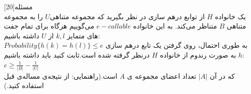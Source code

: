 ‌مسئله[20]
\\
یک خانواده $H$ از توابع درهم سازی در نظر بگیرید که مجموعه متناهی$U$  را به مجموعه متناهی $B$ متناظر می‌کند. به این خانواده $ e-callable$  می‌گوییم هرگاه برای تمام جفت های متمایز $k,l$ از $U$ داشته باشیم:  \\
$Probability\{h(k) = h(l)\} \le e$
به طوری احتمال، روی گرفتن یک تابع درهم سازی $h$  به صورت رندوم از خانواده $H$ درنظر گرفته شده است.ثابت کنید باید داشته باشیم:\\
$e \ge  \frac{1}{|B|} - \frac{1}{|U|}$\\
که در آن $|A|$ تعداد اعضای مجموعه ی $A$ است.(راهنمایی: از نتیجه‌ی مساله‌ی قبل استفاده کنید.)










